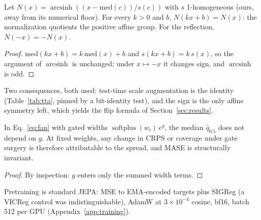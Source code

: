 \begin{lemma}
\label{lem:affine}
Let $N(x) = \operatorname{arcsinh}((x - \mathrm{med}(c))/s(c))$ with
$s$ 1-homogeneous (ours, away from its numerical floor). For every
$k > 0$ and $b$, $N(kx + b) = N(x)$: the normalization quotients the
positive affine group. For the reflection, $N(-x) = -N(x)$.
\end{lemma}
\begin{proof}
$\mathrm{med}(kx{+}b) = k\,\mathrm{med}(x){+}b$ and
$s(kx{+}b) = k\,s(x)$, so the argument of $\operatorname{arcsinh}$ is
unchanged; under $x \mapsto -x$ it changes sign, and
$\operatorname{arcsinh}$ is odd.
\end{proof}

Two consequences, both used: test-time scale augmentation is the
identity (Table~\ref{tab:tta}, pinned by a bit-identity test), and the
sign is the only affine symmetry left, which yields the flip formula of
Section~\ref{sec:results}.

\begin{proposition}
\label{prop:median}
In Eq.~\ref{eq:fan} with gated widths
$\operatorname{softplus}(w_i)\,e^{g}$, the median $\hat q_{0.5}$ does
not depend on $g$. At fixed weights, any change in CRPS or coverage
under gate surgery is therefore attributable to the spread, and MASE is
structurally invariant.
\end{proposition}
\begin{proof}
By inspection: $g$ enters only the summed width terms.
\end{proof}

Pretraining is standard JEPA: MSE to EMA-encoded targets plus SIGReg
\citep{balestriero2025lejepa} (a VICReg control was indistinguishable),
AdamW at $3\times10^{-4}$ cosine, bf16, batch 512 per GPU
(Appendix~\ref{app:training}).
